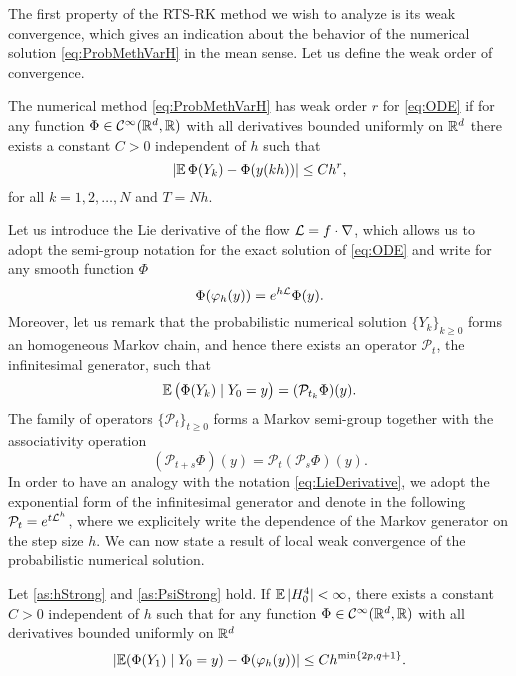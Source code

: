 \documentclass[final,onefignum,onetabnum]{siamonline171218}
\begin{document}
The first property of the RTS-RK method we wish to analyze is its weak convergence, which gives an indication about the behavior of the numerical solution \eqref{eq:ProbMethVarH} in the mean sense. Let us define the weak order of convergence. 
\begin{definition} The numerical method \eqref{eq:ProbMethVarH} has weak order $r$ for \eqref{eq:ODE} if for any function $\Phi\in \mathcal C^\infty(\mathbb{R}^d, \mathbb{R})$ with all derivatives bounded uniformly on $\mathbb{R}^d$ there exists a constant $C > 0$ independent of $h$ such that
	\begin{equation}
		\lvert\operatorname{\mathbb{E}}\Phi(Y_k) - \Phi(y(kh))\rvert \leq Ch^r,
	\end{equation}
	for all $k = 1, 2, \ldots, N$ and $T = Nh$.
\end{definition} 
Let us introduce the Lie derivative of the flow $\mathcal{L} = f \cdot \nabla$, which allows us to adopt the semi-group notation for the exact solution of \eqref{eq:ODE} and write for any smooth function $\Phi$
\begin{equation}\label{eq:LieDerivative}
	\Phi(\phi_h(y)) = e^{h\diffL} \Phi(y).
\end{equation}
Moreover, let us remark that the probabilistic numerical solution $\{Y_k\}_{k\geq 0}$ forms an homogeneous Markov chain, and hence there exists an operator $\mathcal{P}_t$, the infinitesimal generator, such that
\begin{equation}
	\operatorname{\mathbb{E}} \big(\Phi(Y_{k})\mid Y_0 = y\big) = (\mathcal{P}_{t_k}\Phi)(y).
\end{equation}
The family of operators $\{\mathcal{P}_t\}_{t\geq 0}$ forms a Markov semi-group together with the associativity operation
\begin{equation}
	(\mathcal{P}_{t+s}\Phi)(y) = \mathcal{P}_t(\mathcal{P}_s \Phi)(y).
\end{equation}
In order to have an analogy with the notation \eqref{eq:LieDerivative}, we adopt the exponential form of the infinitesimal generator and denote in the following $\mathcal{P}_t = e^{t\mathcal{L}^h}$, where we explicitely write the dependence of the Markov generator on the step size $h$. We can now state a result of local weak convergence of the probabilistic numerical solution.
\begin{lemma}\label{thm:WeakLocalOrder} Let \cref{as:hStrong} and \cref{as:PsiStrong} hold. If $\operatorname{\mathbb{E}}|H_0^4| < \infty$, there exists a constant $C > 0$ independent of $h$ such that for any function $\Phi\in \mathcal{C}^{\infty}(\mathbb{R}^d,\mathbb{R})$ with all derivatives bounded uniformly on $\mathbb{R}^d$
	\begin{equation}
		\lvert\operatorname{\mathbb{E}}(\Phi(Y_1)\mid Y_0 = y) - \Phi(\varphi_h(y))\rvert \leq C h^{\min\{2p, q+1\}}.
	\end{equation}
\end{lemma}
\end{document}
